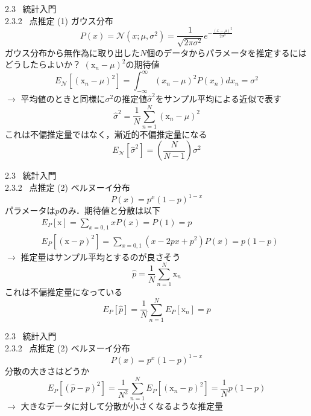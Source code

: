 \documentclass[dvipdfmx,8pt]{beamer}
\begin{document}
  \begin{frame}[t]{2.3 \ 統計入門 \\ \normalsize{2.3.2 \ 点推定}}
    (1) ガウス分布
    \begin{equation*}
      P(x)=\mathcal{N}(x;\mu,\sigma^2)=\frac{1}{\sqrt{2\pi \sigma^2}}e^{-\frac{(x-\mu)^2}{2\sigma^2}}
    \end{equation*}
    ガウス分布から無作為に取り出した$N$個のデータからパラメータを推定するにはどうしたらよいか？
    $(\mathrm{x}_n - \mu)^2$の期待値
    \begin{equation*}
      E_{\mathcal{N}}[(\mathrm{x}_n - \mu)^2] = \int_{-\infty}^{\infty}(x_n - \mu)^2 P(x_n) dx_n = \sigma^2
    \end{equation*}
    $\rightarrow$ 平均値のときと同様に$\sigma^2$の推定値$\hat{\sigma}^2$をサンプル平均による近似で表す
    \begin{equation*}
      \hat{\sigma}^2 = \frac{1}{N}\sum_{n=1}^{N}(\mathrm{x}_n - \mu)^2
    \end{equation*}
    これは不偏推定量ではなく，漸近的不偏推定量になる
    \begin{equation*}
      E_{\mathcal{N}}[\hat{\sigma}^2] = \left( \frac{N}{N-1}\right)\sigma^2
    \end{equation*}
  \end{frame}

  \begin{frame}[t]{2.3 \ 統計入門 \\ \normalsize{2.3.2 \ 点推定}}
    (2) ベルヌーイ分布
    \begin{equation*}
      P(x)=p^x(1-p)^{1-x}
    \end{equation*}
    パラメータは$p$のみ．期待値と分散は以下
    \begin{align*}
      &E_P[\mathrm{x}] = \sum_{x=0,1}xP(x) = P(1) = p\\
      &E_P[(\mathrm{x}-p)^2] = \sum_{x=0,1}(x -2px +p^2)P(x) = p(1-p)
    \end{align*}
    $\rightarrow$ 推定量はサンプル平均とするのが良さそう
    \begin{equation*}
      \hat{p} = \frac{1}{N}\sum_{n=1}^{N}\mathrm{x}_n
    \end{equation*}
    これは不偏推定量になっている
    \begin{equation*}
      E_P[\hat{p}] = \frac{1}{N}\sum_{n=1}^{N}E_P[\mathrm{x}_n] = p
    \end{equation*}
  \end{frame}

  \begin{frame}[t]{2.3 \ 統計入門 \\ \normalsize{2.3.2 \ 点推定}}
    (2) ベルヌーイ分布
    \begin{equation*}
      P(x)=p^x(1-p)^{1-x}
    \end{equation*}
    分散の大きさはどうか
    \begin{equation*}
      E_P[(\hat{p}-p)^2] = \frac{1}{N^2}\sum_{n=1}^{N}E_P[(\mathrm{x}_n-p)^2] = \frac{1}{N}p(1-p)
    \end{equation*}
    $\rightarrow$ 大きなデータに対して分散が小さくなるような推定量
  \end{frame}
\end{document}
